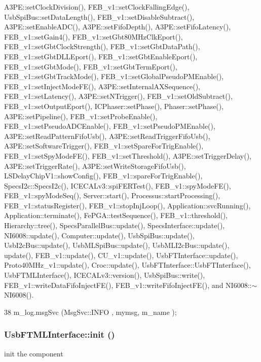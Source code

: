 A3PE::setClockDivision(), FEB\_\-v1::setClockFallingEdge(), UsbSpiBus::setDataLength(), FEB\_\-v1::setDisableSubtract(), A3PE::setEnableADC(), A3PE::setFifoDepth(), A3PE::setFifoLatency(), FEB\_\-v1::setGain4(), FEB\_\-v1::setGbt80MHzClkEport(), FEB\_\-v1::setGbtClockStrength(), FEB\_\-v1::setGbtDataPath(), FEB\_\-v1::setGbtDLLEport(), FEB\_\-v1::setGbtEnableEport(), FEB\_\-v1::setGbtMode(), FEB\_\-v1::setGbtTermEport(), FEB\_\-v1::setGbtTrackMode(), FEB\_\-v1::setGlobalPseudoPMEnable(), FEB\_\-v1::setInjectModeFE(), A3PE::setInternalAXSequence(), FEB\_\-v1::setLatency(), A3PE::setNTrigger(), FEB\_\-v1::setOldSubtract(), FEB\_\-v1::setOutputEport(), ICPhaser::setPhase(), Phaser::setPhase(), A3PE::setPipeline(), FEB\_\-v1::setProbeEnable(), FEB\_\-v1::setPseudoADCEnable(), FEB\_\-v1::setPseudoPMEnable(), A3PE::setReadPatternFifoUsb(), A3PE::setReadTriggerFifoUsb(), A3PE::setSoftwareTrigger(), FEB\_\-v1::setSpareForTrigEnable(), FEB\_\-v1::setSpyModeFE(), FEB\_\-v1::setThreshold(), A3PE::setTriggerDelay(), A3PE::setTriggerRate(), A3PE::setWriteStorageFifoUsb(), LSDelayChipV1::showConfig(), FEB\_\-v1::spareForTrigEnable(), SpecsI2c::SpecsI2c(), ICECALv3::spiFERTest(), FEB\_\-v1::spyModeFE(), FEB\_\-v1::spyModeSeq(), Server::start(), Processus::startProcessing(), FEB\_\-v1::statusRegister(), FEB\_\-v1::stopInjLoop(), Application::svcRunning(), Application::terminate(), FePGA::testSequence(), FEB\_\-v1::threshold(), Hierarchy::tree(), SpecsParallelBus::update(), SpecsInterface::update(), NI6008::update(), Computer::update(), UsbSpiBus::update(), UsbI2cBus::update(), UsbMLSpiBus::update(), UsbMLI2cBus::update(), update(), FEB\_\-v1::update(), CU\_\-v1::update(), UsbFTInterface::update(), Proto40MHz\_\-v1::update(), Croc::update(), UsbFTInterface::UsbFTInterface(), UsbFTMLInterface(), ICECALv3::version(), UsbSpiBus::write(), FEB\_\-v1::writeDataFifoInjectFE(), FEB\_\-v1::writeFifoInjectFE(), and NI6008::$\sim$NI6008().


\begin{DoxyCode}
38 { m_log.msgSvc (MsgSvc::INFO    , mymsg, m_name ); }
\end{DoxyCode}
\hypertarget{classUsbFTMLInterface_a7f7c96ece97e607b88425823a2923a43}{
\subsubsection[{init}]{ UsbFTMLInterface::init ()}}
\label{classUsbFTMLInterface_a7f7c96ece97e607b88425823a2923a43}
init the component

